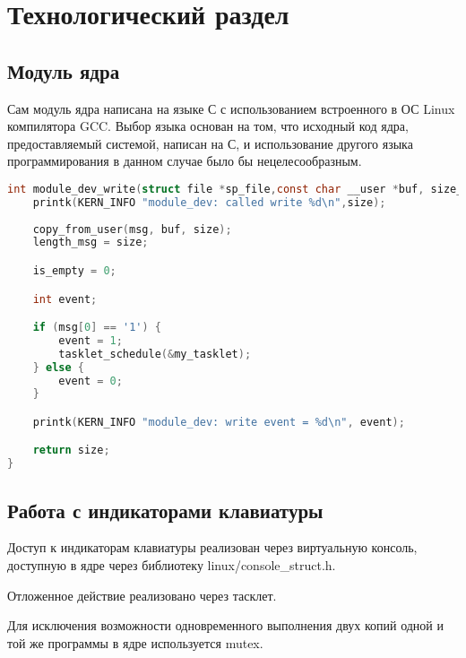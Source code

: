 \chapter{Технологический раздел}

\section{Модуль ядра}

Сам модуль ядра написана на языке С с использованием встроенного в ОС Linux компилятора GCC. Выбор языка основан на том, что исходный код ядра, предоставляемый системой, написан на С,  и использование другого языка программирования в данном случае было бы нецелесообразным. 

\begin{lstlisting}[language=C, caption={Функция, обрабатывающая запись в специальный файл},label=module_dev_write]
int module_dev_write(struct file *sp_file,const char __user *buf, size_t size, loff_t *offset) {
	printk(KERN_INFO "module_dev: called write %d\n",size);
	
	copy_from_user(msg, buf, size);
	length_msg = size;

	is_empty = 0;

	int event;

	if (msg[0] == '1') {
		event = 1;
  		tasklet_schedule(&my_tasklet);
	} else {
		event = 0;
	}

	printk(KERN_INFO "module_dev: write event = %d\n", event);

	return size;
}
\end{lstlisting}

\section{Работа с индикаторами клавиатуры}

Доступ к индикаторам клавиатуры реализован через виртуальную консоль, доступную в ядре через библиотеку linux/console\_struct.h.

Отложенное действие реализовано через тасклет. 

Для исключения возможности одновременного выполнения двух копий одной и той же программы в ядре используется mutex.

